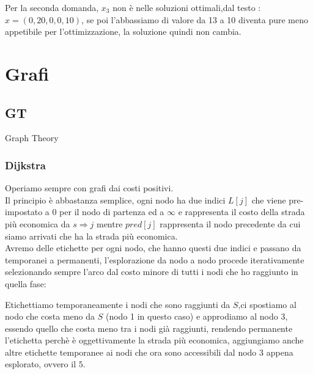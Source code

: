 \documentclass{article}
\begin{document}
Per la seconda domanda, $x_3$ non è nelle soluzioni ottimali,dal testo : $x = (0, 20, 0, 0, 10)$, se poi l'abbassiamo di valore da 13 a 10 diventa pure meno appetibile per l'ottimizzazione, la soluzione quindi non cambia.

\newpage
\section{Grafi}

\subsection{GT}
Graph Theory

\subsubsection{Dijkstra}
Operiamo sempre con grafi dai costi positivi.\\
Il principio è abbastanza semplice, ogni nodo ha due indici $L[j]$ che viene pre-impostato a 0 per il nodo di partenza ed a $\infty$ e rappresenta il costo della strada più economica da $s \Rightarrow j$ mentre $pred[j]$ rappresenta il nodo precedente da cui siamo arrivati che ha la strada più economica.\\
Avremo delle etichette per ogni nodo, che hanno questi due indici e passano da temporanei a permanenti, l'esplorazione da nodo a nodo procede iterativamente selezionando sempre l'arco dal costo minore di tutti i nodi che ho raggiunto in quella fase:\\
\begin{center}
\end{center}
Etichettiamo temporaneamente i nodi che sono raggiunti da $S$,ci spostiamo al nodo che costa meno da $S$ (nodo 1 in questo caso) e approdiamo al nodo 3, essendo quello che costa meno tra i nodi già raggiunti, rendendo permanente l'etichetta perchè è oggettivamente la strada più economica, aggiungiamo anche altre etichette temporanee ai nodi che ora sono accessibili dal nodo $3$ appena esplorato, ovvero il $5$.\\
\end{document}

